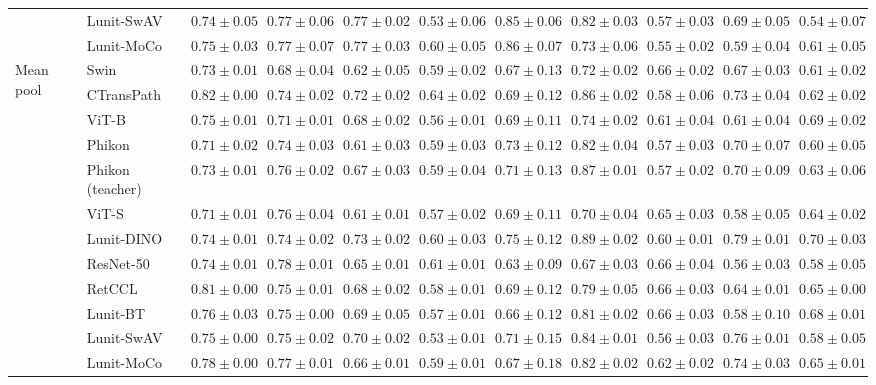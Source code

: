 \begin{tabular}{ll|cccc|c|cccc}
 & Lunit-SwAV & $0.74 \pm 0.05$ & $0.77 \pm 0.06$ & $0.77 \pm 0.02$ & $0.53 \pm 0.06$ & $0.85 \pm 0.06$ & $0.82 \pm 0.03$ & $0.57 \pm 0.03$ & $0.69 \pm 0.05$ & $0.54 \pm 0.07$ \\
 & Lunit-MoCo & $0.75 \pm 0.03$ & $0.77 \pm 0.07$ & $0.77 \pm 0.03$ & $0.60 \pm 0.05$ & $0.86 \pm 0.07$ & $0.73 \pm 0.06$ & $0.55 \pm 0.02$ & $0.59 \pm 0.04$ & $0.61 \pm 0.05$ \\
\cline{1-11}
\multirow[t]{12}{*}{Mean pool} & Swin & $0.73 \pm 0.01$ & $0.68 \pm 0.04$ & $0.62 \pm 0.05$ & $0.59 \pm 0.02$ & $0.67 \pm 0.13$ & $0.72 \pm 0.02$ & $\mathbf{0.66 \pm 0.02}$ & $0.67 \pm 0.03$ & $0.61 \pm 0.02$ \\
 & CTransPath & $\mathbf{0.82 \pm 0.00}$ & $0.74 \pm 0.02$ & $0.72 \pm 0.02$ & $\mathbf{0.64 \pm 0.02}$ & $0.69 \pm 0.12$ & $0.86 \pm 0.02$ & $0.58 \pm 0.06$ & $0.73 \pm 0.04$ & $0.62 \pm 0.02$ \\
 & ViT-B & $0.75 \pm 0.01$ & $0.71 \pm 0.01$ & $0.68 \pm 0.02$ & $0.56 \pm 0.01$ & $0.69 \pm 0.11$ & $0.74 \pm 0.02$ & $0.61 \pm 0.04$ & $0.61 \pm 0.04$ & $0.69 \pm 0.02$ \\
 & Phikon & $0.71 \pm 0.02$ & $0.74 \pm 0.03$ & $0.61 \pm 0.03$ & $0.59 \pm 0.03$ & $0.73 \pm 0.12$ & $0.82 \pm 0.04$ & $0.57 \pm 0.03$ & $0.70 \pm 0.07$ & $0.60 \pm 0.05$ \\
 & Phikon (teacher) & $0.73 \pm 0.01$ & $0.76 \pm 0.02$ & $0.67 \pm 0.03$ & $0.59 \pm 0.04$ & $0.71 \pm 0.13$ & $0.87 \pm 0.01$ & $0.57 \pm 0.02$ & $0.70 \pm 0.09$ & $0.63 \pm 0.06$ \\
 & ViT-S & $0.71 \pm 0.01$ & $0.76 \pm 0.04$ & $0.61 \pm 0.01$ & $0.57 \pm 0.02$ & $0.69 \pm 0.11$ & $0.70 \pm 0.04$ & $0.65 \pm 0.03$ & $0.58 \pm 0.05$ & $0.64 \pm 0.02$ \\
 & Lunit-DINO & $0.74 \pm 0.01$ & $0.74 \pm 0.02$ & $\mathbf{0.73 \pm 0.02}$ & $0.60 \pm 0.03$ & $\mathbf{0.75 \pm 0.12}$ & $\mathbf{0.89 \pm 0.02}$ & $0.60 \pm 0.01$ & $\mathbf{0.79 \pm 0.01}$ & $\mathbf{0.70 \pm 0.03}$ \\
 & ResNet-50 & $0.74 \pm 0.01$ & $\mathbf{0.78 \pm 0.01}$ & $0.65 \pm 0.01$ & $0.61 \pm 0.01$ & $0.63 \pm 0.09$ & $0.67 \pm 0.03$ & $0.66 \pm 0.04$ & $0.56 \pm 0.03$ & $0.58 \pm 0.05$ \\
 & RetCCL & $0.81 \pm 0.00$ & $0.75 \pm 0.01$ & $0.68 \pm 0.02$ & $0.58 \pm 0.01$ & $0.69 \pm 0.12$ & $0.79 \pm 0.05$ & $0.66 \pm 0.03$ & $0.64 \pm 0.01$ & $0.65 \pm 0.00$ \\
 & Lunit-BT & $0.76 \pm 0.03$ & $0.75 \pm 0.00$ & $0.69 \pm 0.05$ & $0.57 \pm 0.01$ & $0.66 \pm 0.12$ & $0.81 \pm 0.02$ & $0.66 \pm 0.03$ & $0.58 \pm 0.10$ & $0.68 \pm 0.01$ \\
 & Lunit-SwAV & $0.75 \pm 0.00$ & $0.75 \pm 0.02$ & $0.70 \pm 0.02$ & $0.53 \pm 0.01$ & $0.71 \pm 0.15$ & $0.84 \pm 0.01$ & $0.56 \pm 0.03$ & $0.76 \pm 0.01$ & $0.58 \pm 0.05$ \\
 & Lunit-MoCo & $0.78 \pm 0.00$ & $0.77 \pm 0.01$ & $0.66 \pm 0.01$ & $0.59 \pm 0.01$ & $0.67 \pm 0.18$ & $0.82 \pm 0.02$ & $0.62 \pm 0.02$ & $0.74 \pm 0.03$ & $0.65 \pm 0.01$ \\
\cline{1-11}
\bottomrule
\end{tabular}
